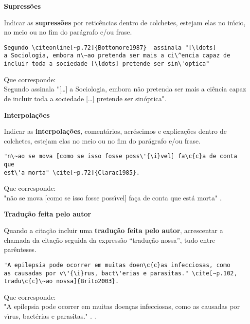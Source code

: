 \begin{alineas}
\textbf{Supress\~oes}

Indicar as \textbf{supress\~oes} por retic\^encias dentro de colchetes, estejam elas no in\'{\i}cio, no meio ou no fim do par\'agrafo e/ou frase.

\begin{verbatim}
Segundo \citeonline[~p.72]{Bottomore1987}  assinala "[\ldots]  
a Sociologia, embora n\~ao pretenda ser mais a ci\^encia capaz de 
incluir toda a sociedade [\ldots] pretende ser sin\'optica"
\end{verbatim}

Que corresponde:\\

Segundo   assinala "[\ldots]  a Sociologia, embora n\~ao pretenda ser mais a ci\^encia capaz de incluir toda a sociedade [\ldots] pretende ser sin\'optica".\\ 

\item

\textbf{Interpola\c{c}\~oes}

Indicar as \textbf{interpola\c{c}\~oes}, coment\'arios, acr\'escimos e explica\c{c}\~oes dentro de colchetes, estejam elas no meio ou no fim do par\'agrafo e/ou frase.

\begin{verbatim}
"n\~ao se mova [como se isso fosse poss\'{\i}vel] fa\c{c}a de conta que 
est\'a morta" \cite[~p.72]{Clarac1985}.
\end{verbatim}

Que corresponde:\\

"n\~ao se mova [como se isso fosse poss\'{\i}vel] fa\c{c}a de conta que 
est\'a morta" \cite[~p.72]{Clarac1985}. \\

\item

\textbf{Tradu\c{c}\~ao feita pelo autor}

Quando a cita\c{c}\~ao incluir uma \textbf{tradu\c{c}\~ao feita pelo autor}, acrescentar a chamada da cita\c{c}\~ao seguida da express\~ao “tradu\c{c}\~ao nossa”, tudo entre par\^enteses.

\begin{verbatim}
"A epilepsia pode ocorrer em muitas doen\c{c}as infecciosas, como 
as causadas por v\'{\i}rus, bact\'erias e parasitas." \cite[~p.102,
tradu\c{c}\~ao nossa]{Brito2003}.
\end{verbatim}

Que corresponde:\\

"A epilepsia pode ocorrer em muitas doen\c{c}as infecciosas, como 
as causadas por v\'{\i}rus, bact\'erias e parasitas." . \cite[~p.102, tradu\c{c}\~ao nossa]{Brito2003}.\\
\end{alineas}

